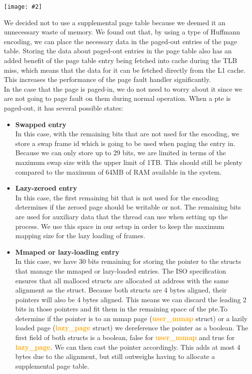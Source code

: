 \documentclass{report}
\newcommand{\bullpara}[2]{\item \textbf{#1} \ #2}
\newcommand{\struct}[1]{\textcolor{orange}{\textbf{#1}}}
\newcommand{\centerimage}[2]{\begin{center}
	\texttt{[image: \#2]}
\end{center}}
\newcommand{\compitem}[1]{\begin{itemize}\setlength\itemsep{-0.1em}#1\end{itemize}}
\begin{document}
				\centerimage{width=\textwidth}{page table entry.png}
				We decided not to use a supplemental page table because we 
				deemed it an unnecessary waste of memory. We found out that, by
				using a type of Huffmann encoding, we can place the necessary 
				data in the paged-out entries of the page table. 
				Storing the data about paged-out entries in the page table also has 
				an added benefit of the page table entry being fetched into cache during
				the TLB miss, which means that the data for it can be fetched directly from the L1 cache. 
				This increases the performance of the page fault handler significantly. \\
				In the case that the page is paged-in, we do not 
				need to worry about it since we are not going to page fault on 
				them during normal operation. When a pte is paged-out, it has 
				several possible states:
				\compitem{
					\bullpara{Swapped entry}
						{\\In this case, with the remaining bits that are not 
						used for the encoding, we store a swap frame id which 
						is going to be used when paging the entry in. Because we
						can only store up to 29 bits, we are limited in terms of
						the maximum swap size with the upper limit of 1TB. This 
						should still be plenty compared to the maximum of 64MB 
						of RAM available in the system.}
					\bullpara{Lazy-zeroed entry}
						{\\In this case, the first remaining bit that is not 
						used for the encoding determines if the zeroed page 
						should be writable or not. The remaining bits are used 
						for auxiliary data that the thread can use when setting 
						up the process. We use this space in our setup in order 
						to keep the maximum mapping size for the lazy loading of
						frames.}
					\bullpara{Mmaped or lazy-loading entry}
						{\\ In this case, we have 30 bits remaining for storing 
						the pointer to the structs that manage the mmaped or 
						lazy-loaded entries. The ISO specification ensures that 
						all malloced structs are allocated at address with the 
						same alignment as the struct. Because both structs are 
						4 bytes aligned, their pointers will also be 4 bytes 
						aligned. This means we can discard the leading 2 bits 
						in those pointers and fit them in the remaining space 
						of the pte.To determine if the pointer is to an mmap 
						page (\struct{user\_mmap} struct) or a lazily loaded 
						page (\struct{lazy\_page} struct) we dereference the 
						pointer as a boolean. The first field of both structs 
						is a boolean, false for \struct{user\_mmap} and true for 
						\struct{lazy\_page}. We can then cast the pointer 
						accordingly. This adds at most 4 bytes due to the 
						alignment, but still outweighs having to allocate a 
						supplemental page table.}
				}
\end{document}

